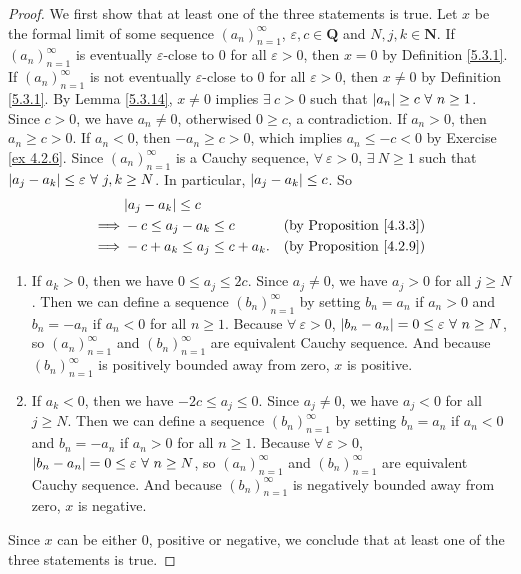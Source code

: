 \begin{proof}
We first show that at least one of the three statements is true.
Let \(x\) be the formal limit of some sequence \((a_n)_{n = 1}^{\infty}\), \(\varepsilon, c \in \mathbf{Q}\) and \(N, j, k \in \mathbf{N}\).
If \((a_n)_{n = 1}^{\infty}\) is eventually \(\varepsilon\)-close to \(0\) for all \(\varepsilon > 0\), then \(x = 0\) by Definition \ref{5.3.1}.
If \((a_n)_{n = 1}^{\infty}\) is not eventually \(\varepsilon\)-close to \(0\) for all \(\varepsilon > 0\), then \(x \neq 0\) by Definition \ref{5.3.1}.
By Lemma \ref{5.3.14}, \(x \neq 0\) implies \(\exists\ c > 0\) such that \(\abs*{a_n} \geq c \ \forall\ n \geq 1\).
Since \(c > 0\), we have \(a_n \neq 0\), otherwised \(0 \geq c\), a contradiction.
If \(a_n > 0\), then \(a_n \geq c > 0\).
If \(a_n < 0\), then \(-a_n \geq c > 0\), which implies \(a_n \leq -c < 0\) by Exercise \ref{ex 4.2.6}.
Since \((a_n)_{n = 1}^{\infty}\) is a Cauchy sequence, \(\forall\ \varepsilon > 0\), \(\exists\ N \geq 1\) such that \(\abs*{a_j - a_k} \leq \varepsilon \ \forall\ j, k \geq N\).
In particular, \(\abs*{a_j - a_k} \leq c\).
So
\begin{align*}
& \abs*{a_j - a_k} \leq c \\
\implies & -c \leq a_j - a_k \leq c & \text{(by Proposition \ref{4.3.3})} \\
\implies & -c + a_k \leq a_j \leq c + a_k. & \text{(by Proposition \ref{4.2.9})} \\
\end{align*}
\begin{enumerate}[label=(\roman*)]
    \item If \(a_k > 0\), then we have \(0 \leq a_j \leq 2c\).
    Since \(a_j \neq 0\), we have \(a_j > 0\) for all \(j \geq N\).
    Then we can define a sequence \((b_n)_{n = 1}^{\infty}\) by setting \(b_n = a_n\) if \(a_n > 0\) and \(b_n = -a_n\) if \(a_n < 0\) for all \(n \geq 1\).
    Because \(\forall\ \varepsilon > 0\), \(\abs*{b_n - a_n} = 0 \leq \varepsilon \ \forall\ n \geq N\), so \((a_n)_{n = 1}^{\infty}\) and \((b_n)_{n = 1}^{\infty}\) are equivalent Cauchy sequence.
    And because \((b_n)_{n = 1}^{\infty}\) is positively bounded away from zero, \(x\) is positive.
    \item If \(a_k < 0\), then we have \(-2c \leq a_j \leq 0\).
    Since \(a_j \neq 0\), we have \(a_j < 0\) for all \(j \geq N\).
    Then we can define a sequence \((b_n)_{n = 1}^{\infty}\) by setting \(b_n = a_n\) if \(a_n < 0\) and \(b_n = -a_n\) if \(a_n > 0\) for all \(n \geq 1\).
    Because \(\forall\ \varepsilon > 0\), \(\abs*{b_n - a_n} = 0 \leq \varepsilon \ \forall\ n \geq N\), so \((a_n)_{n = 1}^{\infty}\) and \((b_n)_{n = 1}^{\infty}\) are equivalent Cauchy sequence.
    And because \((b_n)_{n = 1}^{\infty}\) is negatively bounded away from zero, \(x\) is negative.
\end{enumerate}
Since \(x\) can be either \(0\), positive or negative, we conclude that at least one of the three statements is true.


\end{proof}
